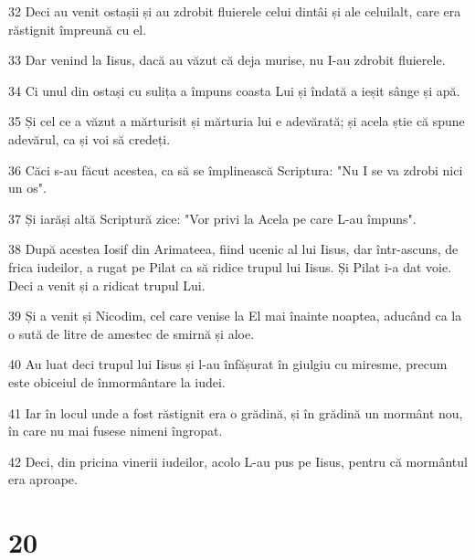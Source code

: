 \par 32 Deci au venit ostașii și au zdrobit fluierele celui dintâi și ale celuilalt, care era răstignit împreună cu el.
\par 33 Dar venind la Iisus, dacă au văzut că deja murise, nu I-au zdrobit fluierele.
\par 34 Ci unul din ostași cu sulița a împuns coasta Lui și îndată a ieșit sânge și apă.
\par 35 Și cel ce a văzut a mărturisit și mărturia lui e adevărată; și acela știe că spune adevărul, ca și voi să credeți.
\par 36 Căci s-au făcut acestea, ca să se împlinească Scriptura: "Nu I se va zdrobi nici un os".
\par 37 Și iarăși altă Scriptură zice: "Vor privi la Acela pe care L-au împuns".
\par 38 După acestea Iosif din Arimateea, fiind ucenic al lui Iisus, dar într-ascuns, de frica iudeilor, a rugat pe Pilat ca să ridice trupul lui Iisus. Și Pilat i-a dat voie. Deci a venit și a ridicat trupul Lui.
\par 39 Și a venit și Nicodim, cel care venise la El mai înainte noaptea, aducând ca la o sută de litre de amestec de smirnă și aloe.
\par 40 Au luat deci trupul lui Iisus și l-au înfășurat în giulgiu cu miresme, precum este obiceiul de înmormântare la iudei.
\par 41 Iar în locul unde a fost răstignit era o grădină, și în grădină un mormânt nou, în care nu mai fusese nimeni îngropat.
\par 42 Deci, din pricina vinerii iudeilor, acolo L-au pus pe Iisus, pentru că mormântul era aproape.

\chapter{20}

